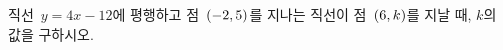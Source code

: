 직선~$y=4x-12$에 평행하고 점~$(-2{,}\mkern3mu\mathopen{}5)$를 지나는 직선이 점~$(6{,}\mkern3mu\mathopen{}k)$를 지날 때, $k$의 값을 구하시오.
